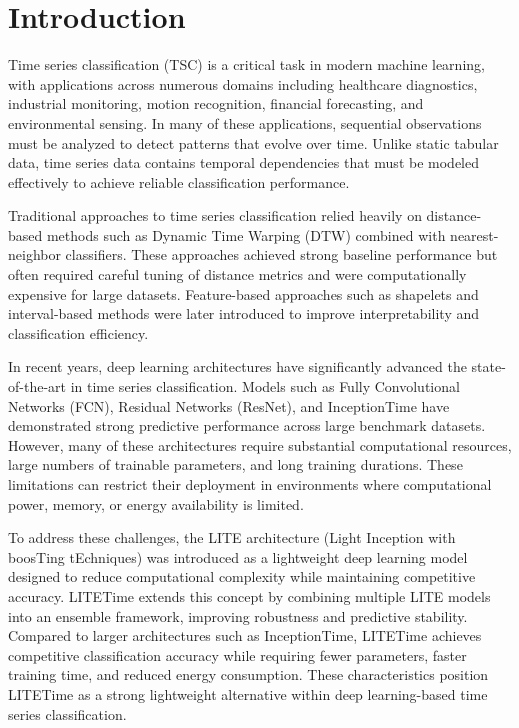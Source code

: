 \documentclass[conference]{IEEEtran}
\begin{document}

\section{Introduction}

Time series classification (TSC) is a critical task in modern machine learning, with applications across numerous domains including healthcare diagnostics, industrial monitoring, motion recognition, financial forecasting, and environmental sensing. In many of these applications, sequential observations must be analyzed to detect patterns that evolve over time. Unlike static tabular data, time series data contains temporal dependencies that must be modeled effectively to achieve reliable classification performance.

Traditional approaches to time series classification relied heavily on distance-based methods such as Dynamic Time Warping (DTW) combined with nearest-neighbor classifiers. These approaches achieved strong baseline performance but often required careful tuning of distance metrics and were computationally expensive for large datasets. Feature-based approaches such as shapelets and interval\mbox{-}based methods were later introduced to improve interpretability and classification efficiency.

In recent years, deep learning architectures have significantly advanced the state-of-the-art in time series classification. Models such as Fully Convolutional Networks (FCN), Residual Networks (ResNet), and InceptionTime have demonstrated strong predictive performance across large benchmark datasets. However, many of these architectures require substantial computational resources, large numbers of trainable parameters, and long training durations. These limitations can restrict their deployment in environments where computational power, memory, or energy availability is limited.

To address these challenges, the LITE architecture (Light Inception with boosTing tEchniques) was introduced as a lightweight deep learning model designed to reduce computational complexity while maintaining competitive accuracy. LITETime extends this concept by combining multiple LITE models into an ensemble framework, improving robustness and predictive stability. Compared to larger architectures such as InceptionTime, LITETime achieves competitive classification accuracy while requiring fewer parameters, faster training time, and reduced energy consumption. These characteristics position LITETime as a strong lightweight alternative within deep learning-based time series classification.
\end{document}
